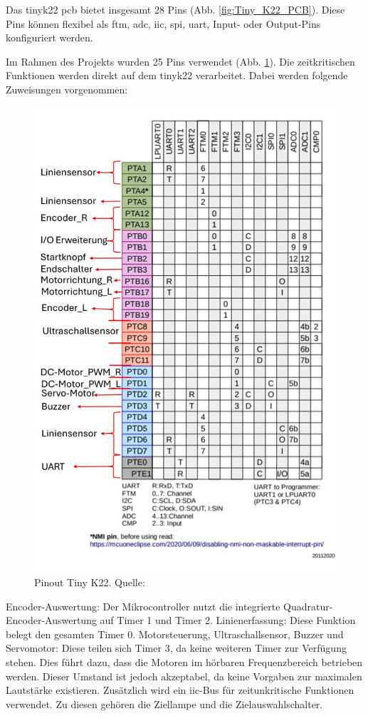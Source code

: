 Das \acrshort{tinyk22} \acrshort{pcb} bietet insgesamt 28 Pins (Abb. \ref{fig:Tiny_K22_PCB}). Diese Pins können flexibel als \acrfull{ftm}, \acrfull{adc}, \acrfull{iic}, \acrfull{spi}, \acrshort{uart}, Input- oder Output-Pins konfiguriert werden.

Im Rahmen des Projekts wurden 25 Pins verwendet (Abb. \ref{fig:Tiny_K22_Pinout_definition}). Die zeitkritischen Funktionen werden direkt auf dem \acrshort{tinyk22} verarbeitet. Dabei werden folgende Zuweisungen vorgenommen:

\begin{figure}[H]
    \centering
    \includegraphics[width=0.8\linewidth, angle=-90]{img/Tiny_K22_Pinout_definition.jpg}
    \caption{Pinout Tiny K22. Quelle: \cite{tiny-K22-Pinout}}
    \label{fig:Tiny_K22_Pinout_definition}
\end{figure}

Encoder-Auswertung: Der Mikrocontroller nutzt die integrierte Quadratur-Encoder-Auswertung auf Timer 1 und Timer 2.
Linienerfassung: Diese Funktion belegt den gesamten Timer 0.
Motorsteuerung, Ultraschallsensor, Buzzer und Servomotor: Diese teilen sich Timer 3, da keine weiteren Timer zur Verfügung stehen. Dies führt dazu, dass die Motoren im hörbaren Frequenzbereich betrieben werden. Dieser Umstand ist jedoch akzeptabel, da keine Vorgaben zur maximalen Lautstärke existieren.
Zusätzlich wird ein \acrshort{iic}-Bus für zeitunkritische Funktionen verwendet. Zu diesen gehören die Ziellampe und die Zielauswahlschalter.

